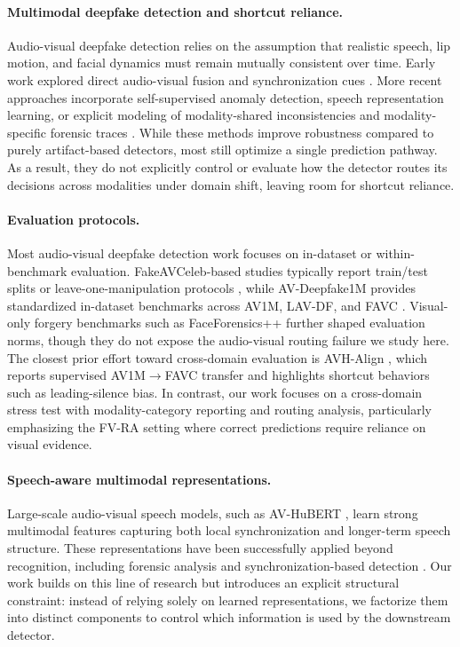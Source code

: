 \documentclass{article}
\begin{document}
\paragraph{Multimodal deepfake detection and shortcut reliance.}
Audio-visual deepfake detection relies on the assumption that realistic speech, lip motion, and facial dynamics must remain mutually consistent over time. Early work explored direct audio-visual fusion and synchronization cues \citep{zhou2021jointav, chung2016syncnet}. More recent approaches incorporate self-supervised anomaly detection, speech representation learning, or explicit modeling of modality-shared inconsistencies and modality-specific forensic traces \citep{feng2023avad, liang2024speechforensics, smeu2025avhalign, du2025cad, como2024lips}. 
While these methods improve robustness compared to purely artifact-based detectors, most still optimize a single prediction pathway. As a result, they do not explicitly control or evaluate how the detector routes its decisions across modalities under domain shift, leaving room for shortcut reliance.

\paragraph{Evaluation protocols.}
Most audio-visual deepfake detection work focuses on in-dataset or within-benchmark evaluation. FakeAVCeleb-based studies typically report train/test splits or leave-one-manipulation protocols \citep{feng2023avad, oorloff2024avff}, while AV-Deepfake1M provides standardized in-dataset benchmarks across AV1M, LAV-DF, and FAVC \citep{cai2024avdeepfake1m}. Visual-only forgery benchmarks such as FaceForensics++ \citep{rossler2019faceforensics} further shaped evaluation norms, though they do not expose the audio-visual routing failure we study here. 
The closest prior effort toward cross-domain evaluation is AVH-Align \citep{smeu2025avhalign}, which reports supervised AV1M$\rightarrow$FAVC transfer and highlights shortcut behaviors such as leading-silence bias. In contrast, our work focuses on a cross-domain stress test with modality-category reporting and routing analysis, particularly emphasizing the FV-RA setting where correct predictions require reliance on visual evidence.


\vspace{-1em}
\paragraph{Speech-aware multimodal representations.}
Large-scale audio-visual speech models, such as AV-HuBERT \citep{shi2022avhubert}, learn strong multimodal features capturing both local synchronization and longer-term speech structure. These representations have been successfully applied beyond recognition, including forensic analysis and synchronization-based detection \citep{liang2024speechforensics, smeu2025avhalign}. 
Our work builds on this line of research but introduces an explicit structural constraint: instead of relying solely on learned representations, we factorize them into distinct components to control which information is used by the downstream detector.
\end{document}
